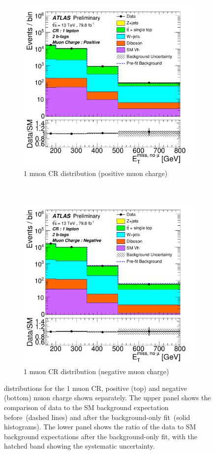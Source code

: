 \begin{figure}[htbp]
\centering
  \begin{subfigure}{1.\textwidth}
    \centering
    \includegraphics[width=.7\textwidth]{figures/monoH/results/fig_05a.pdf}
    \caption{1 muon CR \metnomu distribution (positive muon charge)}
  \end{subfigure}
  \\
  \begin{subfigure}{1.\textwidth}
    \centering
    \includegraphics[width=.7\textwidth]{figures/monoH/results/fig_05b.pdf}
    \caption{1 muon CR \metnomu distribution (negative muon charge)}
  \end{subfigure}
  \caption{\metnomu distributions for the 1 muon CR, positive (top) and negative (bottom) muon charge shown separately. The upper panel shows the comparison of data to the SM background expectation before~(dashed lines) and after the background-only fit~(solid histograms). The lower panel shows the ratio of the data to SM background expectations after the background-only fit, with the hatched band showing the systematic uncertainty.}
  \label{fig:monoH:results:observed:cr1}
\end{figure}

